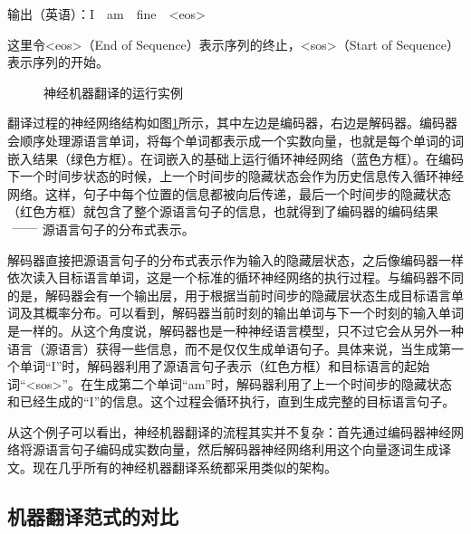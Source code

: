 \vspace{0.3em}
\parinterval  \hspace{5em} 输出（英语）：I\ \ am\ \ fine\ \ <eos>
\vspace{0.5em}

\noindent 这里令<eos>（End of Sequence）表示序列的终止，<sos>（Start of Sequence）表示序列的开始。

\begin{figure}[htp]
\centering

\caption{神经机器翻译的运行实例}
\label{fig:10-7}
\end{figure}

\parinterval 翻译过程的神经网络结构如图\ref{fig:10-7}所示，其中左边是编码器，右边是解码器。编码器会顺序处理源语言单词，将每个单词都表示成一个实数向量，也就是每个单词的词嵌入结果（绿色方框）。在词嵌入的基础上运行循环神经网络（蓝色方框）。在编码下一个时间步状态的时候，上一个时间步的隐藏状态会作为历史信息传入循环神经网络。这样，句子中每个位置的信息都被向后传递，最后一个时间步的隐藏状态（红色方框）就包含了整个源语言句子的信息，也就得到了编码器的编码结果$\ \dash\ $源语言句子的分布式表示。

\parinterval 解码器直接把源语言句子的分布式表示作为输入的隐藏层状态，之后像编码器一样依次读入目标语言单词，这是一个标准的循环神经网络的执行过程。与编码器不同的是，解码器会有一个输出层，用于根据当前时间步的隐藏层状态生成目标语言单词及其概率分布。可以看到，解码器当前时刻的输出单词与下一个时刻的输入单词是一样的。从这个角度说，解码器也是一种神经语言模型，只不过它会从另外一种语言（源语言）获得一些信息，而不是仅仅生成单语句子。具体来说，当生成第一个单词“I”时，解码器利用了源语言句子表示（红色方框）和目标语言的起始词“<sos>”。在生成第二个单词“am”时，解码器利用了上一个时间步的隐藏状态和已经生成的“I”的信息。这个过程会循环执行，直到生成完整的目标语言句子。

\parinterval 从这个例子可以看出，神经机器翻译的流程其实并不复杂：首先通过编码器神经网络将源语言句子编码成实数向量，然后解码器神经网络利用这个向量逐词生成译文。现在几乎所有的神经机器翻译系统都采用类似的架构。

\subsection{机器翻译范式的对比}

